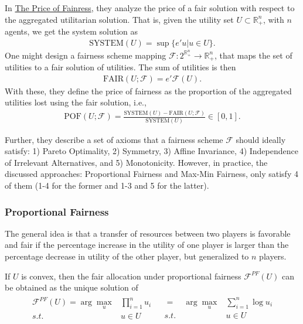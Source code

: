 \documentclass{article}
\newcommand{\R}{\mathbb{R}}
\begin{document}
In \href{https://pubsonline.informs.org/doi/10.1287/opre.1100.0865}{The Price of Fainress}, they analyze the price of a fair solution with respect to the aggregated utilitarian solution. That is, given the utility set $U\subset \R^n_+$, with $n$ agents, we get the system solution as
\begin{align*}
    \text{SYSTEM}(U)=\sup\{e'u | u \in U\}.
\end{align*}
One might design a fairness scheme mapping $\mathcal{F}:2^{\R^n_+ }\rightarrow \R^n_+$, that maps the set of utilities to a fair solution of utilities. The sum of utilities is then
\begin{align*}
    \text{FAIR}(U;\mathcal{F})=e'\mathcal{F}(U).
\end{align*}
With these, they define the price of fairness as the proportion of the aggregated utilities lost using the fair solution, i.e.,
\begin{align*}
    \text{POF}(U;\mathcal{F})=\frac{\text{SYSTEM}(U) - \text{FAIR}(U;\mathcal{F})}{\text{SYSTEM}(U)} \in [0,1].
\end{align*}

Further, they describe a set of axioms
that a fairness scheme $\mathcal{F}$ should ideally satisfy: 1) Pareto Optimality, 2) Symmetry, 3) Affine Invariance, 4) Independence of Irrelevant Alternatives, and 5) Monotonicity. However, in practice, the discussed approaches: Proportional Fairness and Max-Min Fairness, only satisfy 4 of them (1-4 for the former and 1-3 and 5 for the latter). 

\subsubsection{Proportional Fairness}

The general idea is that a transfer of resources between two players is favorable and fair if the percentage increase in the utility of one player
is larger than the percentage decrease in utility of the other player, but generalized to $n$ players.

If $U$ is convex, then the fair allocation under proportional fairness $\mathcal{F}^{PF}(U)$ can be obtained as the unique solution of 
\begin{align*}
\begin{array}{rc}
  \mathcal{F}^{PF}(U)=  \arg\max_{u} & \prod_{i=1}^n u_i \\
    s.t. & u \in U
\end{array} &
\begin{array}{rc}
    = \quad \arg\max_{u} & \sum_{i=1}^n \log u_i \\
    s.t. & u \in U
\end{array}
\end{align*}
\end{document}
